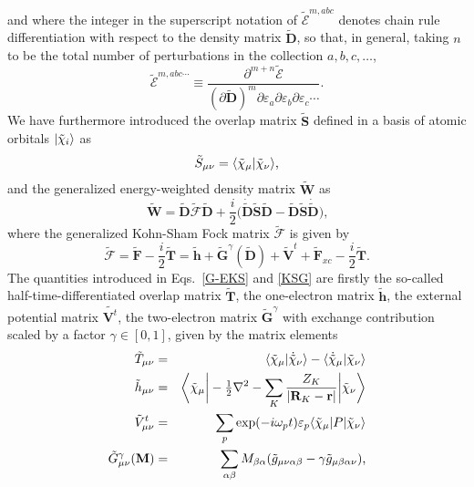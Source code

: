 \documentclass[%
 reprint,
 amsmath,amssymb,
 aps,
]{revtex4-1}
\begin{document}
and where the integer in the superscript notation of $\tilde{\mathcal{E}}^{m, abc}$ denotes chain rule differentiation with respect to the density matrix $\tilde{\mathbf{D}}$, so that, in general, taking $n$ to be the total number of perturbations in the collection $a, b, c, \ldots$, 
\begin{equation}\label{E-chain-rule}
\tilde{\mathcal{E}}^{m, abc\cdots} \equiv \frac{\partial^{m + n}\tilde{\mathcal{E}}}{ \left( \partial \tilde{\mathbf{D}} \right)^{m} \partial \varepsilon_{a} \partial \varepsilon_{b} \partial \varepsilon_{c} \cdots}\text{.}
\end{equation}
We have furthermore introduced the overlap matrix $\tilde{\mathbf{S}}$ defined in a basis of atomic orbitals $|\tilde{\chi}_{i}\rangle$ as 
\begin{equation}\label{S}
\tilde{S}_{\mu \nu} = \langle\tilde{\chi}_{\mu} |\tilde{\chi}_{\nu}\rangle \text{,}
\end{equation}
and the generalized energy-weighted density matrix $\tilde{\mathbf{W}}$ as 
\begin{equation}\label{W}
\tilde{\mathbf{W}} =
\tilde{\mathbf{D}} \tilde{\bm{\mathcal{F}}} \tilde{\mathbf{D}} +
{\textstyle \frac{i}{2}} \bigl(
\dot{\tilde{\mathbf{D}}} \tilde{\mathbf{S}} \tilde{\mathbf{D}}
-\tilde{\mathbf{D}} \tilde{\mathbf{S}} \dot{\tilde{\mathbf{D}}}
\bigr)\text{,}
\end{equation}
where the generalized Kohn-Sham Fock matrix $\tilde{\bm{\mathcal{F}}}$ is given by
\begin{equation}\label{KSG}
\tilde{\bm{\mathcal{F}}} = \tilde{\mathbf{F}} - {\textstyle \frac{i}{2}} \tilde{\mathbf{T}} =
\tilde{\mathbf{h}} +
\tilde{\mathbf{G}}^{\gamma} (\tilde{\mathbf{D}}) 
+ \tilde{\mathbf{V}}^t + \tilde{\mathbf{F}}_{xc} - {\textstyle \frac{i}{2}} \tilde{\mathbf{T}}\text{.}
\end{equation}
The quantities introduced in Eqs.~\eqref{G-EKS} and \eqref{KSG} are firstly the so-called half-time-differentiated overlap matrix $\tilde{\mathbf{T}}$, the one-electron matrix $\tilde{\mathbf{h}}$, the external potential matrix $\tilde{\mathbf{V}^{t}}$, the two-electron matrix $\tilde{\mathbf{G}}^{\gamma}$ with exchange contribution scaled by a factor $\gamma \in [0,1]$, given by the matrix elements
\begin{eqnarray}
\label{t-matrix}
\tilde{T}_{\mu \nu} &=& \langle\tilde{\chi}_{\mu} |\dot{\tilde{\chi}}_{\nu}\rangle - \langle\dot{\tilde{\chi}}_{\mu} |\tilde{\chi}_{\nu}\rangle \\
\label{h-matrix}
\tilde{h}_{\mu \nu} &=& \biggr{\langle} \tilde{\chi}_{\mu} \biggr{|}  
- {\textstyle \frac{1}{2}} \nabla^2 - \sum_K \frac{Z_K}{|\mathbf{R}_K-\mathbf{r}|} 
\biggr{|} \tilde{\chi}_{\nu} \biggr{\rangle} \\ \label{Vt_munu}
\tilde{V}^t_{\mu \nu} &=& 
\sum_{p} \exp(-i \omega_p t) \varepsilon_{p} 
\langle\tilde{\chi}_{\mu}| 
P
|\tilde{\chi}_{\nu}\rangle \\
\label{G-matrix}
\tilde{G}^{\gamma}_{\mu \nu}(\mathbf{M}) &=& \sum_{\alpha \beta} M_{\beta \alpha} (\tilde{g}_{\mu \nu \alpha \beta} - \gamma \tilde{g}_{\mu \beta \alpha \nu}) \text{,}
\end{eqnarray}
\end{document}
